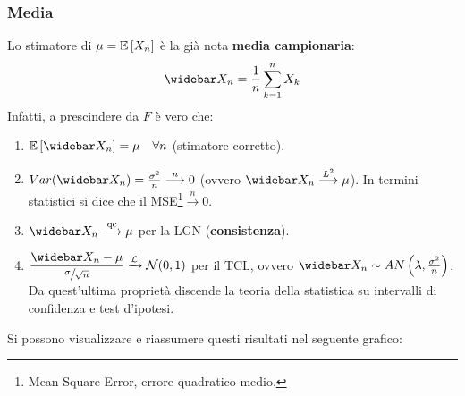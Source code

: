 \subsubsection{Media}
Lo stimatore di $\mu = \mathbb E \left[ X_n \right]$ è la già nota \textbf{media campionaria}: $$\widebar X_n = \frac 1 n \sum_{k=1}^n X_k$$
Infatti, a prescindere da $F$ è vero che:
\begin{enumerate}
  \item $\Ex{\widebar X_n} = \mu \quad \forall n$ (stimatore corretto).
  \item $Var(\widebar X_n) = \frac{\sigma^2}n \stackrel{n}{\longrightarrow} 0$ (ovvero $\widebar X_n \stackrel{L^2}{\longrightarrow} \mu$). In termini statistici si dice che il MSE\footnote{Mean Square Error, errore quadratico medio.}$\stackrel{n}{\longrightarrow} 0$.
  \item $\widebar X_n \stackrel{\text{qc}}{\longrightarrow} \mu$ per la LGN (\textbf{consistenza}).
  \item $\dfrac{\widebar X_n-\mu}{\sfrac\sigma {\sqrt n}} \xrightarrow{\Lc} \Nc(0,1)$ per il TCL, ovvero $\widebar X_n \sim AN\left( \lambda, \frac{\sigma^2}n \right)$. \\
	Da quest'ultima proprietà discende la teoria della statistica su intervalli di confidenza e test d'ipotesi.
\end{enumerate}
Si possono visualizzare e riassumere questi risultati nel seguente grafico: \\

